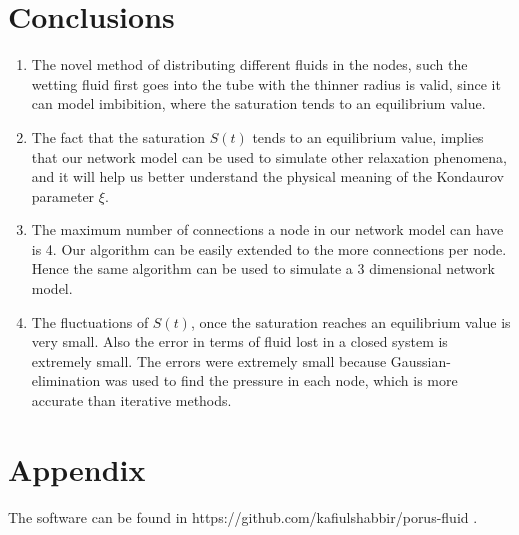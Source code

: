 \documentclass{crm-article}
\begin{document}
	\section{Conclusions} \label{sec:conclusion}
		\begin{enumerate}
		
			\item The novel method of distributing different fluids in the nodes, such the wetting fluid first goes into the tube with the thinner radius is valid, since it can model imbibition, where the saturation tends to an equilibrium value.
			
			\item The fact that the saturation $S(t)$ tends to an equilibrium value, implies that our network model can be used to simulate other relaxation phenomena, and it will help us better understand the physical meaning of the Kondaurov parameter $\xi$.
			
			\item The maximum number of connections a node in our network model can have is 4. Our algorithm can be easily extended to the more connections per node. Hence the same algorithm can be used to simulate a 3 dimensional network model.
			
			\item The fluctuations of $S(t)$, once the saturation reaches an equilibrium value is very small. Also the error in terms of fluid lost in a closed system is extremely small. The errors were extremely small because Gaussian-elimination was used to find the pressure in each node, which is more accurate than iterative methods.	
		\end{enumerate}
	
	\section{Appendix}
		The software can be found in https://github.com/kafiulshabbir/porus-fluid .
	
\end{document}
